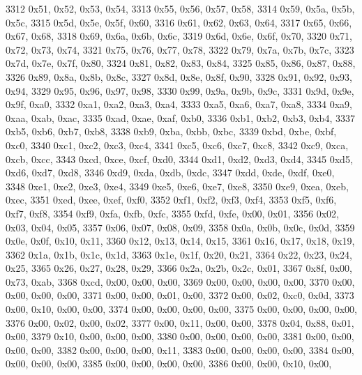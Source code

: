 \begin{DoxyCode}
3312       0x51, 0x52, 0x53, 0x54,
3313       0x55, 0x56, 0x57, 0x58,
3314       0x59, 0x5a, 0x5b, 0x5c,
3315       0x5d, 0x5e, 0x5f, 0x60,
3316       0x61, 0x62, 0x63, 0x64,
3317       0x65, 0x66, 0x67, 0x68,
3318       0x69, 0x6a, 0x6b, 0x6c,
3319       0x6d, 0x6e, 0x6f, 0x70,
3320       0x71, 0x72, 0x73, 0x74,
3321       0x75, 0x76, 0x77, 0x78,
3322       0x79, 0x7a, 0x7b, 0x7c,
3323       0x7d, 0x7e, 0x7f, 0x80,
3324       0x81, 0x82, 0x83, 0x84,
3325       0x85, 0x86, 0x87, 0x88,
3326       0x89, 0x8a, 0x8b, 0x8c,
3327       0x8d, 0x8e, 0x8f, 0x90,
3328       0x91, 0x92, 0x93, 0x94,
3329       0x95, 0x96, 0x97, 0x98,
3330       0x99, 0x9a, 0x9b, 0x9c,
3331       0x9d, 0x9e, 0x9f, 0xa0,
3332       0xa1, 0xa2, 0xa3, 0xa4,
3333       0xa5, 0xa6, 0xa7, 0xa8,
3334       0xa9, 0xaa, 0xab, 0xac,
3335       0xad, 0xae, 0xaf, 0xb0,
3336       0xb1, 0xb2, 0xb3, 0xb4,
3337       0xb5, 0xb6, 0xb7, 0xb8,
3338       0xb9, 0xba, 0xbb, 0xbc,
3339       0xbd, 0xbe, 0xbf, 0xc0,
3340       0xc1, 0xc2, 0xc3, 0xc4,
3341       0xc5, 0xc6, 0xc7, 0xc8,
3342       0xc9, 0xca, 0xcb, 0xcc,
3343       0xcd, 0xce, 0xcf, 0xd0,
3344       0xd1, 0xd2, 0xd3, 0xd4,
3345       0xd5, 0xd6, 0xd7, 0xd8,
3346       0xd9, 0xda, 0xdb, 0xdc,
3347       0xdd, 0xde, 0xdf, 0xe0,
3348       0xe1, 0xe2, 0xe3, 0xe4,
3349       0xe5, 0xe6, 0xe7, 0xe8,
3350       0xe9, 0xea, 0xeb, 0xec,
3351       0xed, 0xee, 0xef, 0xf0,
3352       0xf1, 0xf2, 0xf3, 0xf4,
3353       0xf5, 0xf6, 0xf7, 0xf8,
3354       0xf9, 0xfa, 0xfb, 0xfc,
3355       0xfd, 0xfe, 0x00, 0x01,
3356       0x02, 0x03, 0x04, 0x05,
3357       0x06, 0x07, 0x08, 0x09,
3358       0x0a, 0x0b, 0x0c, 0x0d,
3359       0x0e, 0x0f, 0x10, 0x11,
3360       0x12, 0x13, 0x14, 0x15,
3361       0x16, 0x17, 0x18, 0x19,
3362       0x1a, 0x1b, 0x1c, 0x1d,
3363       0x1e, 0x1f, 0x20, 0x21,
3364       0x22, 0x23, 0x24, 0x25,
3365       0x26, 0x27, 0x28, 0x29,
3366       0x2a, 0x2b, 0x2c, 0x01,
3367       0x8f, 0x00, 0x73, 0xab,
3368       0xcd, 0x00, 0x00, 0x00,
3369       0x00, 0x00, 0x00, 0x00,
3370       0x00, 0x00, 0x00, 0x00,
3371       0x00, 0x00, 0x01, 0x00,
3372       0x00, 0x02, 0xc0, 0x0d,
3373       0x00, 0x10, 0x00, 0x00,
3374       0x00, 0x00, 0x00, 0x00,
3375       0x00, 0x00, 0x00, 0x00,
3376       0x00, 0x02, 0x00, 0x02,
3377       0x00, 0x11, 0x00, 0x00,
3378       0x04, 0x88, 0x01, 0x00,
3379       0x10, 0x00, 0x00, 0x00,
3380       0x00, 0x00, 0x00, 0x00,
3381       0x00, 0x00, 0x00, 0x00,
3382       0x00, 0x00, 0x00, 0x11,
3383       0x00, 0x00, 0x00, 0x00,
3384       0x00, 0x00, 0x00, 0x00,
3385       0x00, 0x00, 0x00, 0x00,
3386       0x00, 0x00, 0x10, 0x00,

\end{DoxyCode}
